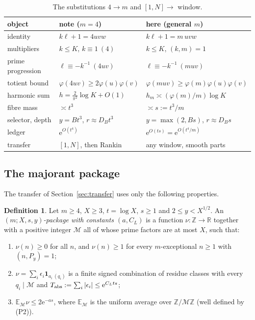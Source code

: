 \documentclass[10pt,reqno]{amsart}
\theoremstyle{definition}
\newtheorem{definition}[theorem]{Definition}
\newcommand{\Z}{\mathbb Z}
\newcommand{\M}{\mathcal M}
\newcommand{\E}{\mathbb E}
\newcommand{\ind}{\mathbf 1}
\newcommand{\e}{\mathrm e}
\newcommand{\Tabs}{T_{\rm abs}}
\begin{document}
\begin{table}[ht]
\centering
\small
\begin{tabular}{@{}lll@{}}
\toprule
object & note \cite{TQ} ($m=4$) & here (general $m$)\\
\midrule
identity & $k\ell+1=4uvw$ & $k\ell+1=m\,uvw$\\
multipliers & $k\leq K$, $k\equiv1\ (4)$ & $k\leq K$, $(k,m)=1$\\
prime progression & $\ell\equiv-k^{-1}\ (4uv)$ & $\ell\equiv-k^{-1}\ (muv)$\\
totient bound & $\varphi(4uv)\geq2\varphi(u)\varphi(v)$ &
   $\varphi(muv)\geq\varphi(m)\varphi(u)\varphi(v)$\\
harmonic sum & $h=\tfrac2{\pi^2}\log K+O(1)$ &
   $h_m\asymp(\varphi(m)/m)\log K$\\
fibre mass & $\asymp t^3$ & $\asymp s:=t^3/m$\\
selector, depth & $y=Bt^3$, $r\approx D_Bt^3$ & $y=\max(2,Bs)$, $r\approx D_Bs$\\
ledger & $\e^{O(t^4)}$ & $\e^{O(ts)}=\e^{O(t^4/m)}$\\
transfer & $[1,N]$, then Rankin & any window, smooth parts\\
\bottomrule
\end{tabular}
\caption{The substitutions $4\to m$ and $[1,N]\to$ window.}
\label{tab:subst}
\end{table}

\subsection{The majorant package}
The transfer of Section~\ref{sec:transfer} uses only the following
properties.

\begin{definition}\label{def:package}
Let $m\geq4$, $X\geq3$, $t=\log X$, $s\geq1$ and $2\leq y<X^{1/2}$.  An
\emph{$(m;X,s,y)$-package with constants $(a,C_L)$} is a function
$\nu:\Z\to\mathbb R$ together with a positive integer $\M$ all of whose
prime factors are at most $X$, such that:
\begin{enumerate}
\item[(P1)] $\nu(n)\geq0$ for all $n$, and $\nu(n)\geq1$ for every
$m$-exceptional $n\geq1$ with $(n,P_y)=1$;
\item[(P2)] $\nu=\sum_i\epsilon_i\ind_{a_i\ (q_i)}$ is a finite signed
combination of residue classes with every $q_i\mid\M$ and
$\Tabs:=\sum_i|\epsilon_i|\leq\e^{C_Lts}$;
\item[(P3)] $\E_{\M}\nu\leq2\e^{-as}$, where $\E_{\M}$ is the uniform
average over $\Z/\M\Z$ (well defined by (P2)).
\end{enumerate}
\end{definition}
\end{document}
